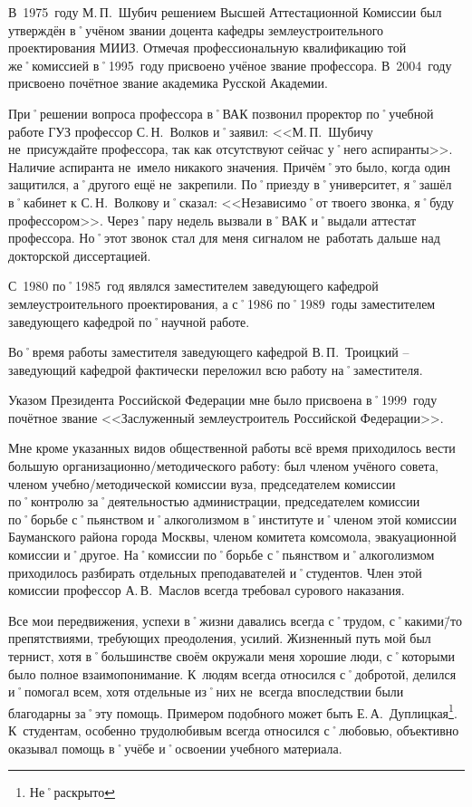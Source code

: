 В~1975~году М.\,П.~Шубич решением Высшей Аттестационной Комиссии был утверждён в˚учёном звании доцента кафедры землеустроительного проектирования МИИЗ. Отмечая профессиональную квалификацию той же˚комиссией в˚1995~году присвоено учёное звание профессора. В~2004~году присвоено почётное звание академика Русской Академии.

При˚решении вопроса профессора в˚ВАК позвонил проректор по˚учебной работе ГУЗ профессор С.\,Н.~Волков и˚заявил: <<М.\,П.~Шубичу не~присуждайте профессора, так как отсутствуют сейчас у˚него аспиранты>>. Наличие аспиранта не~имело никакого значения. Причём˚это было, когда один защитился, а˚другого ещё не~закрепили. По˚приезду в˚университет, я˚зашёл в˚кабинет к С.\,Н.~Волкову и˚сказал: <<Независимо˚от твоего звонка, я˚буду профессором>>. Через˚пару недель вызвали в˚ВАК и˚выдали аттестат профессора. Но˚этот звонок стал для меня сигналом не~работать дальше над докторской диссертацией.

С~1980 по˚1985~год являлся заместителем заведующего кафедрой землеустроительного проектирования, а с˚1986 по˚1989~годы заместителем заведующего кафедрой по˚научной работе.

Во˚время работы заместителя заведующего кафедрой В.\,П.~Троицкий \--- заведующий кафедрой фактически переложил всю работу на˚заместителя.

Указом Президента Российской Федерации мне было присвоена в˚1999~году почётное звание <<Заслуженный землеустроитель Российской Федерации>>. 

Мне кроме указанных видов общественной работы всё время приходилось вести большую организационно\-/методического работу: был членом учёного совета, членом учебно\-/методической комиссии вуза, председателем комиссии по˚контролю за˚деятельностью администрации, председателем комиссии по˚борьбе с˚пьянством и˚алкоголизмом в˚институте и˚членом этой комиссии Бауманского района города Москвы, членом комитета комсомола, эвакуационной комиссии и˚другое. На˚комиссии по˚борьбе с˚пьянством и˚алкоголизмом приходилось разбирать отдельных преподавателей и˚студентов. Член этой комиссии профессор А.\,В.~Маслов всегда требовал сурового наказания.

Все мои передвижения, успехи в˚жизни давались всегда с˚трудом, с˚какими\=/то препятствиями, требующих преодоления, усилий. Жизненный путь мой был тернист, хотя в˚большинстве своём окружали меня хорошие люди, с˚которыми было полное взаимопонимание. К~людям всегда относился с˚добротой, делился и˚помогал всем, хотя отдельные из˚них не~всегда впоследствии были благодарны за˚эту помощь. Примером подобного может быть Е.\,А.~Дуплицкая\footnote{Не˚раскрыто}. К~студентам, особенно трудолюбивым всегда относился с˚любовью, объективно оказывал помощь в˚учёбе и˚освоении учебного материала.


